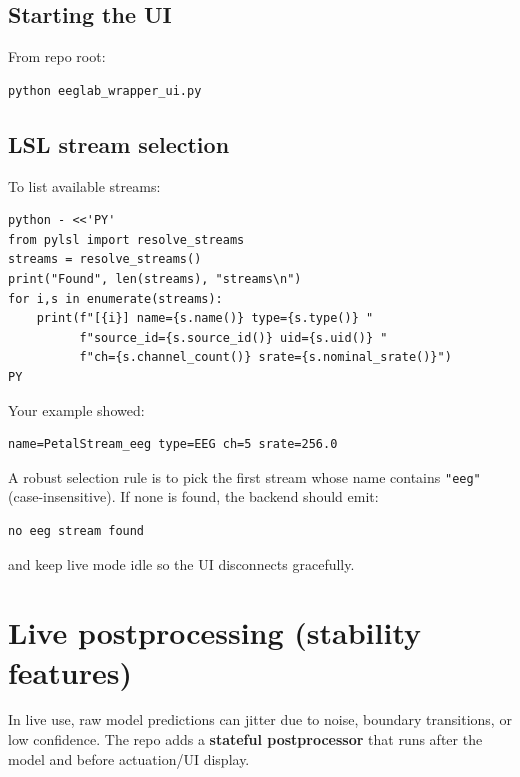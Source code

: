 \documentclass[11pt]{article}
\begin{document}
\subsection{Starting the UI}
From repo root:
\begin{lstlisting}
python eeglab_wrapper_ui.py
\end{lstlisting}

\subsection{LSL stream selection}
To list available streams:
\begin{lstlisting}
python - <<'PY'
from pylsl import resolve_streams
streams = resolve_streams()
print("Found", len(streams), "streams\n")
for i,s in enumerate(streams):
    print(f"[{i}] name={s.name()} type={s.type()} "
          f"source_id={s.source_id()} uid={s.uid()} "
          f"ch={s.channel_count()} srate={s.nominal_srate()}")
PY
\end{lstlisting}

Your example showed:
\begin{lstlisting}
name=PetalStream_eeg type=EEG ch=5 srate=256.0
\end{lstlisting}

A robust selection rule is to pick the first stream whose name contains \texttt{"eeg"} (case-insensitive). If none is found, the backend should emit:
\begin{lstlisting}
no eeg stream found
\end{lstlisting}
and keep live mode idle so the UI disconnects gracefully.

\section{Live postprocessing (stability features)}
In live use, raw model predictions can jitter due to noise, boundary transitions, or low confidence. The repo adds a \textbf{stateful postprocessor} that runs after the model and before actuation/UI display.
\end{document}
